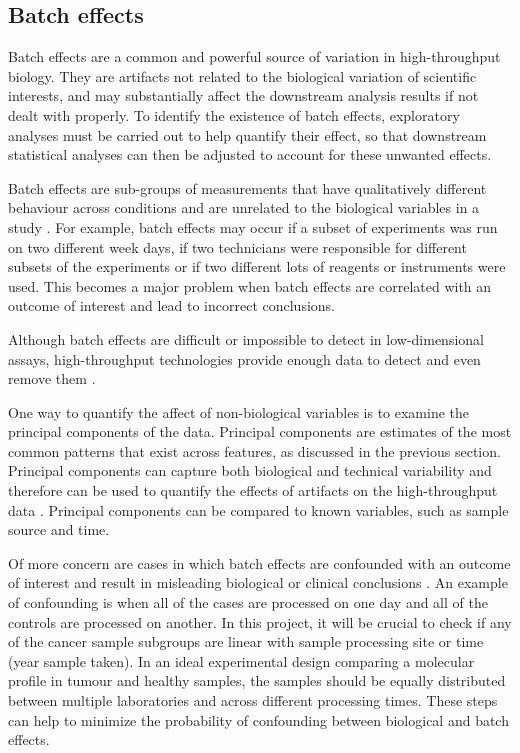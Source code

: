    

\newpage


\subsection{Batch effects}

Batch effects are a common and powerful source of variation in high-throughput biology.  They are artifacts not related to the biological variation of scientific interests, and may substantially affect the downstream analysis results if not dealt with properly. 
To identify the existence of batch effects, exploratory analyses must be carried out to help quantify their effect, so that downstream statistical analyses can then be adjusted to account for these unwanted effects. 
 
Batch effects are sub-groups of measurements that have qualitatively different behaviour across conditions and are unrelated to the biological variables in a study \cite{Leek2010}. For example, batch effects may occur if a subset of experiments was run on two different week days, if two technicians were responsible for different subsets of the experiments or if two different lots of reagents or instruments were used. This becomes a major problem when batch effects are correlated with an outcome of interest and lead to incorrect conclusions.
 
Although batch effects are difficult or impossible to detect in low-dimensional assays, high-throughput technologies provide enough data to detect and even remove them \cite{Leek2010}. 
 
One way to quantify the affect of non-biological variables is to examine the principal components of the data. Principal components are estimates of the most common patterns that exist across features, as discussed in the previous section. Principal components can capture both biological and technical variability and therefore can be used to quantify the effects of artifacts on the high-throughput data \cite{LeekCapturingAnalysis}. Principal components can be compared to known variables, such as sample source and time. 
 
Of more concern are cases in which batch effects are confounded with an outcome of interest and result in misleading biological or clinical conclusions \cite{Leek2010}. An example of confounding is when all of the cases are processed on one day and all of the controls are processed on another. In this project, it will be crucial to check if any of the cancer sample subgroups are linear with sample processing site or time (year sample taken). In an ideal experimental design comparing a molecular profile in tumour and healthy samples, the samples should be equally distributed between multiple laboratories and across different processing times. These steps can help to minimize the probability of confounding between biological and batch effects.
 
